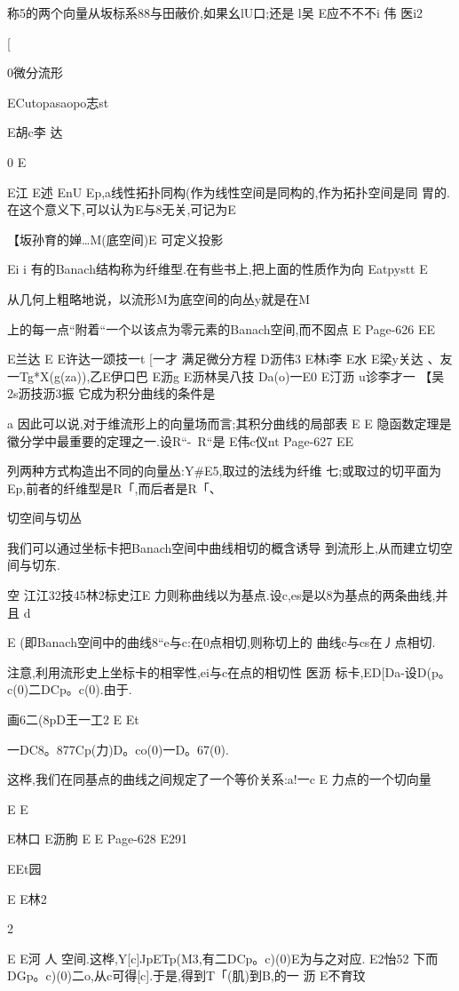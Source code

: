 称5的两个向量从坂标系88与田蔽价,如果幺lU口;还是
l吴
E应不不不i
伟
医i2

[

0微分流形

ECutopasaopo志st

E胡c李
达

0
E

E江
E述
EnU
Ep,a线性拓扑同构(作为线性空间是同构的,作为拓扑空间是同
胃的.在这个意义下,可以认为E与8无关,可记为E

【坂孙育的婵…M(底空间)E
可定义投影

Ei
i
有的Banach结构称为纤维型.在有些书上,把上面的性质作为向
Eatpystt
E

从几何上粗略地说，以流形M为底空间的向丛y就是在M

上的每一点“附着“一个以该点为零元素的Banach空间,而不囡点
E
Page-626
EE

E兰达
E
E许达一颂技一t
[一才
满足微分方程
D沥伟3
E林i李
E水
E梁y关达
、友一Tg*X(g(za)),乙E伊口巴
E沥g
E沥林吴八技
Da(o)一E0
E汀沥
u诊李才一
【吴2s沥技沥3振
它成为积分曲线的条件是

a
因此可以说,对于维流形上的向量场而言;其积分曲线的局部表
E
E
隐函数定理是徽分学中最重要的定理之一.设R“-~R“是
E伟c仪nt
Page-627
EE

列两种方式构造出不同的向量丛:Y#E5,取过的法线为纤维
七;或取过的切平面为Ep,前者的纤维型是R「,而后者是R「、

切空间与切丛

我们可以通过坐标卡把Banach空间中曲线相切的概含诱导
到流形上,从而建立切空间与切东.

空
江江32技45林2标史江E
力则称曲线以为基点.设c,es是以8为基点的两条曲线,并且
d

E
(即Banach空间中的曲线8“e与c:在0点相切,则称切上的
曲线c与cs在丿点相切.

注意,利用流形史上坐标卡的相宰性,ei与c在点的相切性
医沥
标卡,ED[Da-设D(p。c(0)二DCp。c(0).由于.

画6二(8pD王一工2
E
Et

一DC8。877Cp(力)D。co(0)一D。67(0).

这桦,我们在同基点的曲线之间规定了一个等价关系:a!一c
E
力点的一个切向量

E
E

E林口
E沥朐
E
E
Page-628
E291

EEt园

E
E林2

2

E
E河
人
空间.这桦,Y[c]JpETp(M3,有二DCp。c)(0)E为与之对应.
E2怡52
下而DGp。c)(0)二o,从c可得[c].于是,得到T「(肌)到B,的一
沥
E不育玟

